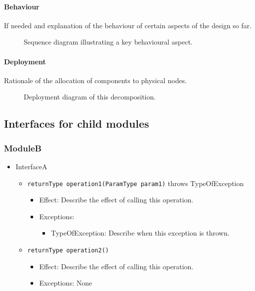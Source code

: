     \paragraph{Behaviour}
    If needed and explanation of the behaviour of certain aspects of the design so
    far.

    \begin{figure}[!htp]
    	\centering
    	\caption{Sequence diagram illustrating a key behavioural aspect.
    	}\label{fig:it1-seq_aspect1}
    \end{figure}

    \paragraph{Deployment}
    Rationale of the allocation of components to physical nodes.

    \begin{figure}[!htp]
    	\centering
    	\caption{Deployment diagram of this decomposition.
    	}\label{fig:it1-depl_main}
    \end{figure}

\subsection{Interfaces for child modules}
    \subsubsection{ModuleB}
    \begin{itemize}
    	\item InterfaceA
    	\begin{itemize}
    		\item \texttt{returnType operation1(ParamType param1)} throws TypeOfException
    		\begin{itemize}
    			\item Effect: Describe the effect of calling this operation.
    			\item Exceptions:
    			\begin{itemize}
    				\item TypeOfException: Describe when this exception is thrown.
    			\end{itemize}
    		\end{itemize}

    		\item \texttt{returnType operation2()}
    		\begin{itemize}
    			\item Effect: Describe the effect of calling this operation.
    			\item Exceptions: None
    		\end{itemize}
    	\end{itemize}
    \end{itemize}

